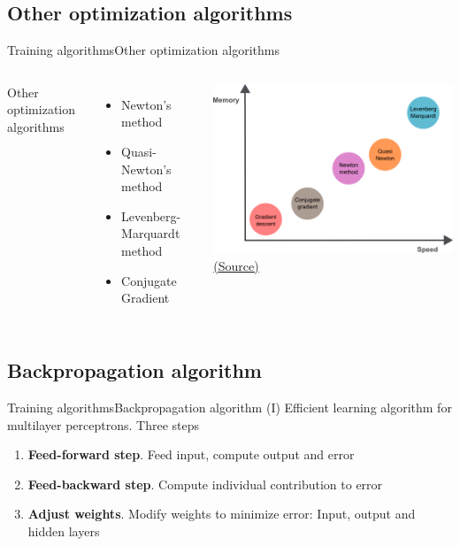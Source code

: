 \documentclass[10pt,compress]{beamer} %
\begin{document}
\subsection{Other optimization algorithms}
\begin{frame}{Training algorithms}{Other optimization algorithms}
	\begin{columns}
		Other optimization algorithms
		\begin{itemize}
			\item Newton's method
			\item Quasi-Newton's method
			\item Levenberg-Marquardt method
			\item Conjugate Gradient
		\end{itemize}

		\begin{center}
			\includegraphics[width=\linewidth]{figs/memory-speed.png}\\
			\scriptsize \href{https://www.neuraldesigner.com/blog/5_algorithms_to_train_a_neural_network}{(Source)}
		\end{center}
	\end{columns}
\end{frame}

\subsection{Backpropagation algorithm}
\begin{frame}{Training algorithms}{Backpropagation algorithm (I)}
Efficient learning algorithm for multilayer perceptrons. Three steps
\begin{enumerate}
\item \textbf{Feed-forward step}. Feed input, compute output and error
\item \textbf{Feed-backward step}. Compute individual contribution to error
\item \textbf{Adjust weights}. Modify weights to minimize error: Input, output and hidden layers
\end{enumerate}
\end{frame}
\end{document}
